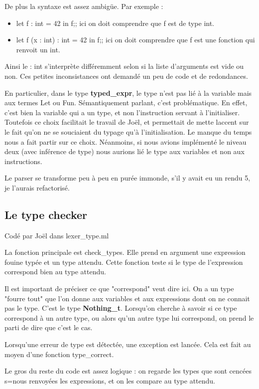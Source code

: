 \documentclass[a4paper,10pt]{report}
\begin{document}
De plus la syntaxe est assez ambigüe. Par exemple :

\begin{itemize}
\item let f : int = 42 in f;; ici on doit comprendre que f est de type int.
\item let f (x : int) : int = 42 in f;; ici on doit comprendre que f est une fonction qui renvoit un int.
\end{itemize}

Ainsi le : int s'interprète différemment selon si la liste d'arguments est vide ou non. Ces petites inconsistances ont demandé un peu de code et de redondances. 

En particulier, dans le type \textbf{typed\_expr}, le type n'est pas lié à la variable mais aux termes Let ou Fun. Sémantiquement parlant, c'est problématique. En effet, c'est bien la variable qui a un type, et non l'instruction servant à l'initialiser. Toutefois ce choix facilitait le travail de Joël, et permettait de mette laccent sur le fait qu'on ne se souciaient du typage qu'à l'initialisation. Le manque du temps nous a fait partir sur ce choix. Néanmoins, si nous avions implémenté le niveau deux (avec inférence de type) nous aurions lié le type aux variables et non aux instructions. 

Le parser se transforme peu à peu en purée immonde, s'il y avait eu un rendu 5, je l'aurais refactorisé.

\subsection{Le type checker}

Codé par Joël dans lexer\_type.ml

La fonction principale est check\_types. Elle prend en argument une expression fouine typée et un type attendu. Cette fonction teste si le type de l'expression correspond bien au type attendu.

Il est important de préciser ce que "correspond" veut dire ici. On a un type "fourre tout" que l'on donne aux variables et aux expressions dont on ne connait pas le type. C'est le type \textbf{Nothing\_t}. Lorsqu'on cherche à savoir si ce type correspond à un autre type, ou alors qu'un autre type lui correspond, on prend le parti de dire que c'est le cas.

Lorsqu'une erreur de type est détectée, une exception est lancée. Cela est fait au moyen d'une fonction type\_correct.

Le gros du reste du code est assez logique : on regarde les types que sont cencées s=nous renvoyées les expressions, et on les compare au type attendu.
\end{document}
